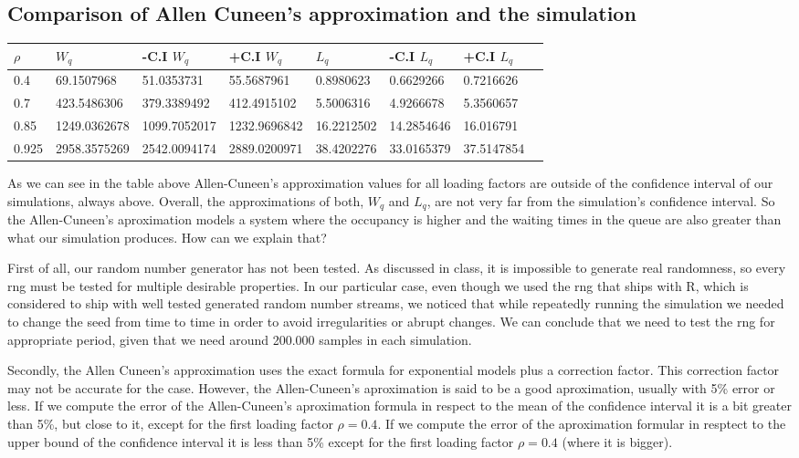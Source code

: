 \documentclass[]{article}
\begin{document}
\subsection{Comparison of Allen Cuneen's approximation and the
simulation}\label{comparison-of-allen-cuneens-approximation-and-the-simulation}

\begin{longtable}[]{@{}llllllll@{}}
\toprule
\(\rho\) & \(W_{q}\) & -C.I \(W_{q}\) & +C.I \(W_{q}\) & \(L_{q}\) &
-C.I \(L_{q}\) & +C.I \(L_{q}\) &\tabularnewline
\midrule
\endhead
0.4 & 69.1507968 & 51.0353731 & 55.5687961 & 0.8980623 & 0.6629266 &
0.7216626\tabularnewline
0.7 & 423.5486306 & 379.3389492 & 412.4915102 & 5.5006316 & 4.9266678 &
5.3560657\tabularnewline
0.85 & 1249.0362678 & 1099.7052017 & 1232.9696842 & 16.2212502 &
14.2854646 & 16.016791\tabularnewline
0.925 & 2958.3575269 & 2542.0094174 & 2889.0200971 & 38.4202276 &
33.0165379 & 37.5147854\tabularnewline
\bottomrule
\end{longtable}

As we can see in the table above Allen-Cuneen's approximation values for
all loading factors are outside of the confidence interval of our
simulations, always above. Overall, the approximations of both, \(W_q\)
and \(L_{q}\), are not very far from the simulation's confidence
interval. So the Allen-Cuneen's aproximation models a system where the
occupancy is higher and the waiting times in the queue are also greater
than what our simulation produces. How can we explain that?

First of all, our random number generator has not been tested. As
discussed in class, it is impossible to generate real randomness, so
every rng must be tested for multiple desirable properties. In our
particular case, even though we used the rng that ships with R, which is
considered to ship with well tested generated random number streams, we
noticed that while repeatedly running the simulation we needed to change
the seed from time to time in order to avoid irregularities or abrupt
changes. We can conclude that we need to test the rng for appropriate
period, given that we need around 200.000 samples in each simulation.

Secondly, the Allen Cuneen's approximation uses the exact formula for
exponential models plus a correction factor. This correction factor may
not be accurate for the case. However, the Allen-Cuneen's aproximation
is said to be a good aproximation, usually with 5\% error or less. If we
compute the error of the Allen-Cuneen's aproximation formula in respect
to the mean of the confidence interval it is a bit greater than 5\%, but
close to it, except for the first loading factor \(\rho=0.4\). If we
compute the error of the aproximation formular in resptect to the upper
bound of the confidence interval it is less than 5\% except for the
first loading factor \(\rho=0.4\) (where it is bigger).
\end{document}
